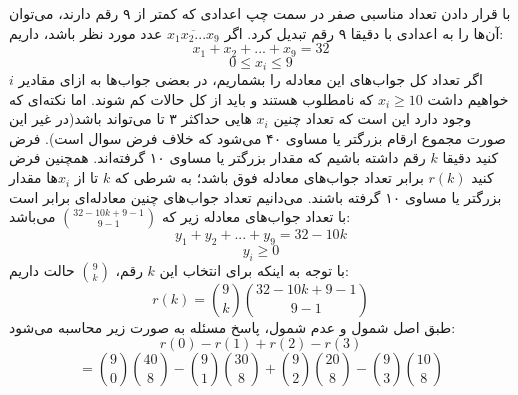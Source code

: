 \p
با قرار دادن تعداد مناسبی صفر در سمت چپ اعدادی که کمتر از ۹ رقم دارند، می‌توان آن‌ها را به اعدادی با دقیقا ۹ رقم تبدیل کرد. اگر 
$\overline{x_1x_2...x_9}$
عدد مورد نظر باشد، داریم: 
$$x_1 + x_2 + ... + x_9 = 32$$
$$0 \leq x_i \leq 9$$
\p
اگر تعداد کل جواب‌های این معادله را بشماریم، در بعضی جواب‌ها به ازای مقادیر $i$
 خواهیم داشت
  $x_i \geq 10$
 که نامطلوب هستند و باید از کل حالات کم شوند. اما نکته‌ای که وجود دارد این است که تعداد چنین 
$x_i$
هایی  
حداکثر ۳ تا می‌تواند باشد(در غیر این صورت مجموع ارقام بزرگتر یا مساوی ۴۰ می‌شود که خلاف فرض سوال است).
\p
فرض کنید دقیقا
$k$
رقم داشته باشیم که مقدار بزرگتر یا مساوی ۱۰ گرفته‌اند.
همچنین فرض کنید
$r(k)$
برابر تعداد جواب‌های معادله فوق باشد؛ به شرطی که 
$k$
تا از 
$x_i$ها مقدار بزرگتر یا مساوی ۱۰ گرفته باشند. 
می‌دانیم تعداد جواب‌های چنین معادله‌ای برابر است با تعداد جواب‌های معادله زیر که 
$\binom{32 - 10k + 9 - 1}{9 - 1}$
می‌باشد:
$$y_1 + y_2 + ... + y_9 = 32 - 10k$$ 
$$y_i \geq 0$$
با توجه به اینکه
برای انتخاب این 
$k$
رقم،
$\binom{9}{k}$
حالت 
داریم:
$$r(k) = \binom{9}{k}\binom{32 - 10k + 9 - 1}{9 - 1}$$
\p
طبق اصل شمول و عدم شمول، پاسخ مسئله به صورت زیر محاسبه می‌شود:
$$r(0) - r(1) + r(2) - r(3)$$
$$= \binom{9}{0}\binom{40}{8} - \binom{9}{1}\binom{30}{8} + \binom{9}{2}\binom{20}{8} - \binom{9}{3}\binom{10}{8}$$